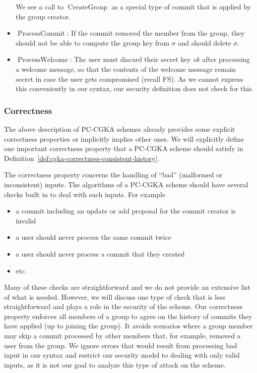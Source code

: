 \begin{itemize}
	      We see a call to $\operatorname{CreateGroup}$ as a special type of commit that is applied by the group creator.


	\item $\operatorname{ProcessCommit}$: If the commit removed the member from the group, they should not be able to compute the group key from $\sigma$ and should delete $\sigma$.
	\item $\operatorname{ProcessWelcome}$:  The user must discard their secret key $sk$ after processing a welcome message, so that the contents of the welcome message remain secret in case the user gets compromised (recall FS). As we cannot express this conveniently in our syntax, our security definition does not check for this.
\end{itemize}

\subsubsection{Correctness}

The above description of PC-CGKA schemes already provides some explicit correctness properties or implicitly implies other ones. We will explicitly define one important correctness property that a PC-CGKA scheme should satisfy in Definition~\vref{def:cgka-correctness-consistent-history}. 

The correctness property concerns the handling of ``bad'' (malformed or inconsistent) inputs. The algorithms of a PC-CGKA scheme should have several checks built in to deal with such inputs. For example
\begin{itemize}
	\item a commit including an update or add proposal for the commit creator is invalid
	\item a user should never process the same commit twice
	\item a user should never process a commit that they created
	\item etc.
\end{itemize}
Many of these checks are straightforward and we do not provide an extensive list of what is needed. However, we will discuss one type of check that is less straightforward and plays a role in the security of the scheme. Our correctness property enforces all members of a group to agree on the history of commits they have applied (up to joining the group). It avoids scenarios where a group member may skip a commit processed by other members that, for example, removed a user from the group. We ignore errors that would result from processing bad input in our syntax and restrict our security model to dealing with only valid inputs, as it is not our goal to analyze this type of attack on the scheme.

